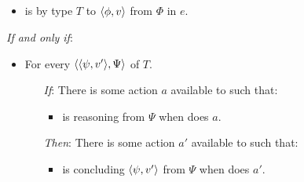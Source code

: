 \subsection{}
\label{sec:ptr0}

\begin{note}
    \begin{definition}[\ptC{2}]
    \label{def:ptC}

    \noindent%

    \begin{itemize}
    \item
      \vAgent{} is \emph{} by type \(T\) to \(\langle \phi, v \rangle\) from \(\Phi\) in \(e\).
    \end{itemize}

    \emph{If and only if}:

    \begin{itemize}[noitemsep]
    \item
      For every \tI{} \(\langle \langle \psi, v' \rangle, \Psi \rangle\) of \(T\).
      \begin{itemize}[noitemsep]
      \item[\emph{If}:]
        There is some action \(a\) available to \vAgent{} such that:
        \begin{itemize}
        \item
          \vAgent{} is reasoning from \(\Psi\) when \vAgent{} does \(a\).
        \end{itemize}
      \item[\emph{Then}:]
        There is some action \(a'\) available to \vAgent{} such that:
        \begin{itemize}
        \item
          \vAgent{} is concluding \(\langle \psi, v' \rangle\) from \(\Psi\) when \vAgent{} does \(a'\).
        \end{itemize}
      \end{itemize}
    \end{itemize}
    \vspace{-\baselineskip}
  \end{definition}
\end{note}

